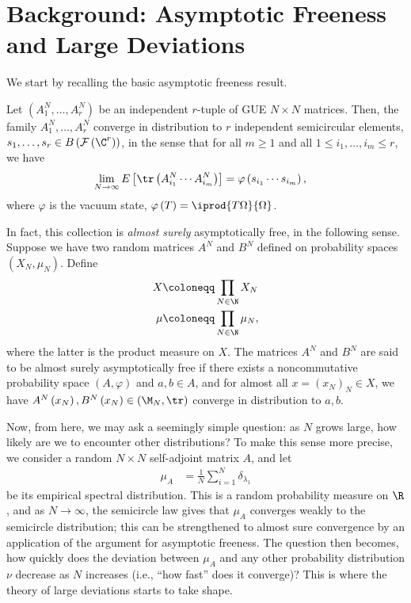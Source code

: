 \documentclass[10pt]{mypackage}
\renewcommand{\coloneq}{\coloneqq}
\begin{document}
\RaggedRight

\section{Background: Asymptotic Freeness and Large Deviations}%
We start by recalling the basic asymptotic freeness result.
\begin{proposition}
  Let $\left( A_1^{N},\dots,A_r^{N} \right)$ be an independent $r$-tuple of GUE $N\times N$ matrices. Then, the family $A_1^N,\dots,A_r^N$ converge in distribution to $r$ independent semicircular elements, $s_1,\dots,s_r\in B\left( \mathcal{F}\left( \C^r \right) \right)$, in the sense that for all $m\geq 1$ and all $1\leq i_1,\dots,i_m \leq r$, we have
  \begin{align*}
    \lim_{N\rightarrow\infty} E\left[ \tr\left( A_{i_1}^N\cdots A_{i_m}^N \right) \right] &= \varphi\left( s_{i_1}\cdots s_{i_m} \right),
  \end{align*}
  where $\varphi$ is the vacuum state, $\varphi\left( T \right) = \iprod{T\Omega}{\Omega}$.
\end{proposition}
In fact, this collection is \textit{almost surely} asymptotically free, in the following sense. Suppose we have two random matrices $A^N$ and $B^N$ defined on probability spaces $\left( X_N,\mu_N \right)$. Define
\begin{align*}
  X &\coloneq \prod_{N\in \N} X_N\\\
  \mu &\coloneq \prod_{N\in \N}\mu_N,
\end{align*}
where the latter is the product measure on $X$. The matrices $A^N$ and $B^N$ are said to be almost surely asymptotically free if there exists a noncommutative probability space $\left( A,\varphi \right)$ and $a,b\in A$, and for almost all $x = \left( x_N \right)_N\in X$, we have $A^N\left(x_N\right),B^N\left(x_N\right)\in \left( \M_N,\tr \right)$ converge in distribution to $a,b$.

Now, from here, we may ask a seemingly simple question: as $N$ grows large, how likely are we to encounter other distributions? To make this sense more precise, we consider a random $N\times N$ self-adjoint matrix $A$, and let
\begin{align*}
  \mu_A &= \frac{1}{N}\sum_{i=1}^{N}\delta_{\lambda_1}
\end{align*}
be its empirical spectral distribution. This is a random probability measure on $\R$, and as $N\rightarrow \infty$, the semicircle law gives that $\mu_A$ converges weakly to the semicircle distribution; this can be strengthened to almost sure convergence by an application of the argument for asymptotic freeness. The question then becomes, how quickly does the deviation between $\mu_A$ and any other probability distribution $\nu$ decrease as $N$ increases (i.e., ``how fast'' does it converge)? This is where the theory of large deviations starts to take shape.
\end{document}
